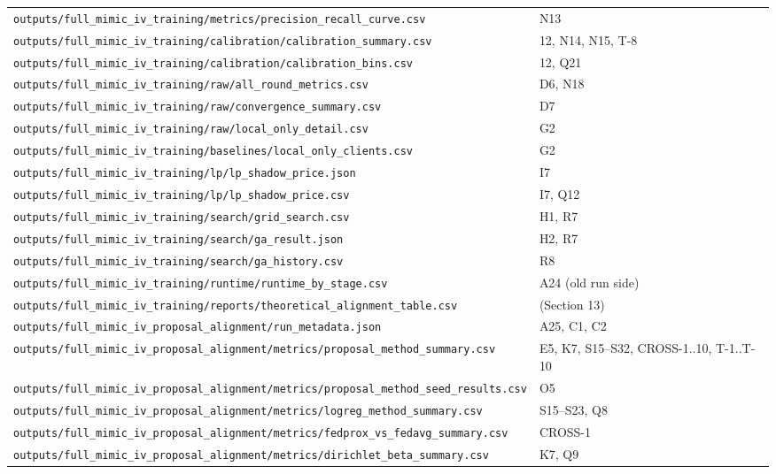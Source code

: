\documentclass{article}
\begin{document}
\begin{table}[H]
{\begin{tabular}{ll}
    \texttt{outputs/full\_mimic\_iv\_training/metrics/precision\_recall\_curve.csv} & N13 \\
    \texttt{outputs/full\_mimic\_iv\_training/calibration/calibration\_summary.csv} & 12, N14, N15, T-8 \\
    \texttt{outputs/full\_mimic\_iv\_training/calibration/calibration\_bins.csv} & 12, Q21 \\
    \texttt{outputs/full\_mimic\_iv\_training/raw/all\_round\_metrics.csv} & D6, N18 \\
    \texttt{outputs/full\_mimic\_iv\_training/raw/convergence\_summary.csv} & D7 \\
    \texttt{outputs/full\_mimic\_iv\_training/raw/local\_only\_detail.csv} & G2 \\
    \texttt{outputs/full\_mimic\_iv\_training/baselines/local\_only\_clients.csv} & G2 \\
    \texttt{outputs/full\_mimic\_iv\_training/lp/lp\_shadow\_price.json} & I7 \\
    \texttt{outputs/full\_mimic\_iv\_training/lp/lp\_shadow\_price.csv} & I7, Q12 \\
    \texttt{outputs/full\_mimic\_iv\_training/search/grid\_search.csv} & H1, R7 \\
    \texttt{outputs/full\_mimic\_iv\_training/search/ga\_result.json} & H2, R7 \\
    \texttt{outputs/full\_mimic\_iv\_training/search/ga\_history.csv} & R8 \\
    \texttt{outputs/full\_mimic\_iv\_training/runtime/runtime\_by\_stage.csv} & A24 (old run side) \\
    \texttt{outputs/full\_mimic\_iv\_training/reports/theoretical\_alignment\_table.csv} & (Section 13) \\
    \texttt{outputs/full\_mimic\_iv\_proposal\_alignment/run\_metadata.json} & A25, C1, C2 \\
    \texttt{outputs/full\_mimic\_iv\_proposal\_alignment/metrics/proposal\_method\_summary.csv} & E5, K7, S15--S32, CROSS-1..10, T-1..T-10 \\
    \texttt{outputs/full\_mimic\_iv\_proposal\_alignment/metrics/proposal\_method\_seed\_results.csv} & O5 \\
    \texttt{outputs/full\_mimic\_iv\_proposal\_alignment/metrics/logreg\_method\_summary.csv} & S15--S23, Q8 \\
    \texttt{outputs/full\_mimic\_iv\_proposal\_alignment/metrics/fedprox\_vs\_fedavg\_summary.csv} & CROSS-1 \\
    \texttt{outputs/full\_mimic\_iv\_proposal\_alignment/metrics/dirichlet\_beta\_summary.csv} & K7, Q9 \\

\end{tabular}}
\end{table}
\end{document}
